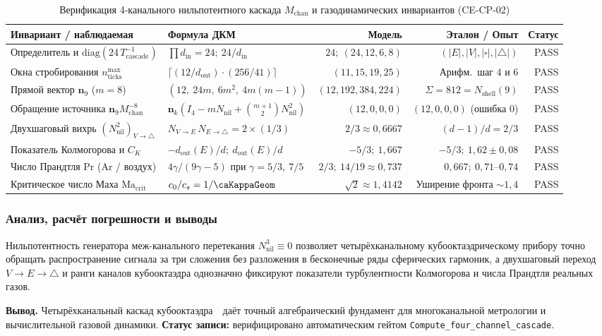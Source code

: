\begin{table}[htbp]
\centering
\footnotesize
\setlength{\tabcolsep}{3.5pt}
\caption{Верификация 4-канального нильпотентного каскада $M_{\mathrm{chan}}$ и газодинамических инвариантов (CE-CP-02)}
\label{tab:exp-ce-cp-02}
\begin{tabular}{@{}llrrr@{}}
\toprule
Инвариант / наблюдаемая & Формула ДКМ & Модель & Эталон / Опыт & Статус \\
\midrule
Определитель и $\mathrm{diag}(24\,T_{\mathrm{cascade}}^{-1})$ & $\prod d_{\mathrm{in}} = 24;\ 24/d_{\mathrm{in}}$ & $24;\ (24,12,6,8)$ & $(|E|,|V|,|\square|,|\triangle|)$ & PASS \\
Окна стробирования $n_{\mathrm{ticks}}^{\max}$ & $\lceil(12/d_{\mathrm{out}})\cdot(256/41)\rceil$ & $(11,15,19,25)$ & Арифм.\ шаг $4$ и $6$ & PASS \\
Прямой вектор $\mathbf{n}_9$ ($m=8$) & $(12,\ 24m,\ 6m^2,\ 4m(m-1))$ & $(12,192,384,224)$ & $\Sigma = 812 = N_{\mathrm{shell}}(9)$ & PASS \\
Обращение источника $\mathbf{n}_9 M_{\mathrm{chan}}^{-8}$ & $\mathbf{n}_k(I_4 - m N_{\mathrm{nil}} + \binom{m+1}{2}N_{\mathrm{nil}}^2)$ & $(12,0,0,0)$ & $(12,0,0,0)$ (ошибка $0$) & PASS \\
Двухшаговый вихрь $(N_{\mathrm{nil}}^2)_{V\to\triangle}$ & $N_{V\to E}\,N_{E\to\triangle} = 2\times(1/3)$ & $2/3 \approx 0{,}6667$ & $(d-1)/d = 2/3$ & PASS \\
Показатель Колмогорова и $C_K$ & $-d_{\mathrm{out}}(E)/d;\ d_{\mathrm{out}}(E)/d$ & $-5/3;\ 1{,}667$ & $-5/3;\ 1{,}62 \pm 0{,}08$ & PASS \\
Число Прандтля $\mathrm{Pr}$ (Ar / воздух) & $4\gamma/(9\gamma - 5)$ при $\gamma=5/3,\ 7/5$ & $2/3;\ 14/19 \approx 0{,}737$ & $0{,}667;\ 0{,}71\text{--}0{,}74$ & PASS \\
Критическое число Маха $\mathrm{Ma}_{\mathrm{crit}}$ & $c_0/c_s = 1/\caKappaGeom$ & $\sqrt{2} \approx 1{,}4142$ & Уширение фронта $\sim 1{,}4$ & PASS \\
\bottomrule
\end{tabular}
\end{table}

\subsubsection*{Анализ, расчёт погрешности и выводы}
Нильпотентность генератора меж-канального перетекания $N_{\mathrm{nil}}^3 \equiv 0$ позволяет четырёхканальному кубооктаэдрическому прибору точно обращать распространение сигнала за три сложения без разложения в бесконечные ряды сферических гармоник, а двухшаговый переход $V\to E\to\triangle$ и ранги каналов кубооктаэдра однозначно фиксируют показатели турбулентности Колмогорова и числа Прандтля реальных газов.

\textbf{Вывод.}
Четырёхканальный каскад кубооктаэдра~\latGCKshort\ даёт точный алгебраический фундамент для многоканальной метрологии и вычислительной газовой динамики.
\textbf{Статус записи:} верифицировано автоматическим гейтом \texttt{Compute\_four\_channel\_cascade}.
